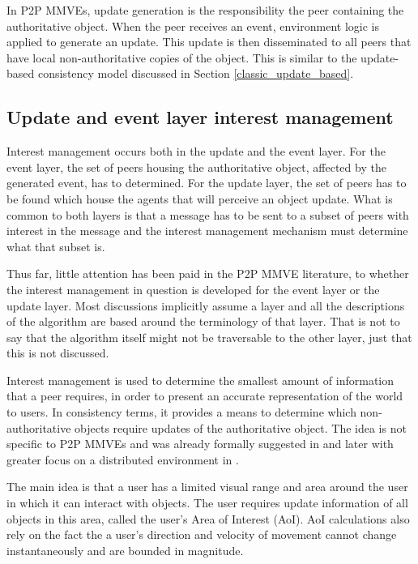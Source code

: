 In P2P MMVEs, update generation is the responsibility the peer containing the authoritative object. When the peer receives an event, environment logic is applied to generate an update. This update is then disseminated to all peers that have local non-authoritative copies of the object. This is similar to the update-based consistency model discussed in Section \ref{classic_update_based}.

\subsection{Update and event layer interest management}
\label{key_challenges_im}

Interest management occurs both in the update and the event layer. For the event layer, the set of peers housing the authoritative object, affected by the generated event, has to determined. For the update layer, the set of peers has to be found which house the agents that will perceive an object update. What is common to both layers is that a message has to be sent to a subset of peers with interest in the message and the interest management mechanism must determine what that subset is.

Thus far, little attention has been paid in the P2P MMVE literature, to whether the interest management in question is developed for the event layer or the update layer. Most discussions implicitly assume a layer and all the descriptions of the algorithm are based around the terminology of that layer. That is not to say that the algorithm itself might not be traversable to the other layer, just that this is not discussed.

Interest management is used to determine the smallest amount of information that a peer requires, in order to present an accurate representation of the world to users. In consistency terms, it provides a means to determine which non-authoritative objects require updates of the authoritative object. The idea is not specific to P2P MMVEs and was already formally suggested in \cite{First_IM} and later with greater focus on a distributed environment in \cite{Whang_agent_based_IM}.

The main idea is that a user has a limited visual range and area around the user in which it can interact with objects. The user requires update information of all objects in this area, called the user's Area of Interest (AoI). AoI calculations also rely on the fact the a user's direction and velocity of movement cannot change instantaneously and are bounded in magnitude.

